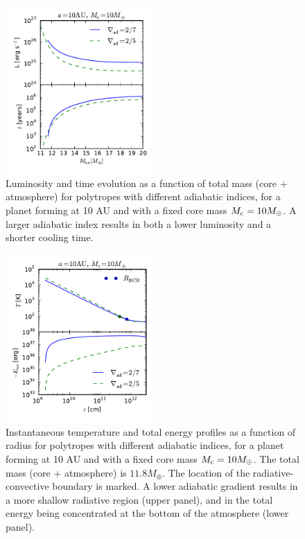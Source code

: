 \documentclass[apj]{emulateapj}
\begin{document}
\begin{figure}[h]
\centering
\includegraphics[width=0.5\textwidth]{../../figs/ModelAtmospheres/RadSelfGravRealEOS/EOSeffects/Ltplot_poly.pdf}
\caption{Luminosity and time evolution as a function of total mass (core + atmosphere) for polytropes with different adiabatic indices, for a planet forming at 10 AU and with a fixed core mass $M_{\rm c}=10 M_{\oplus}$. A larger adiabatic index results in both a lower luminosity and a shorter cooling time.}
\label{fig:Ltplotpoly}
\end{figure}

\begin{figure}[h]
\centering
\includegraphics[width=0.5\textwidth]{../../figs/ModelAtmospheres/RadSelfGravRealEOS/EOSeffects/TErplot_poly.pdf}
\caption{Instantaneous temperature and total energy profiles as a function of radius for polytropes with different adiabatic indices, for a planet forming at 10 AU and with a fixed core mass $M_{\rm c}=10 M_{\oplus}$. The total mass (core + atmosphere) is $11.8 M_{\oplus}$. The location of the radiative-convective boundary is marked. A lower adiabatic gradient results in a more shallow radiative region (upper panel), and in the total energy being concentrated at the bottom of the atmosphere (lower panel).}
\label{fig:ETrplotpoly}
\end{figure}
\end{document}
